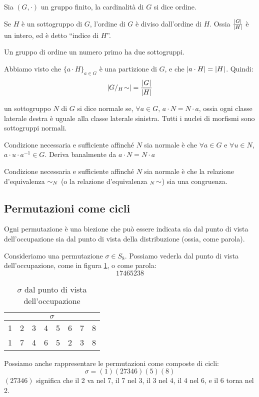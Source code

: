 \begin{theorem}
Sia $(G, \cdot)$ un gruppo finito, la cardinalit\`a di $G$ si dice ordine.

Se $H$ \`e un sottogruppo di $G$, l'ordine di $G$ \`e diviso dall'ordine di $H$. Ossia $\frac{\left\lvert{G}\right\rvert}{\left\lvert{H}\right\rvert}$ \`e un intero, ed \`e detto ``indice di $H$''.
\end{theorem}
\begin{oss}
Un gruppo di ordine un numero primo ha due sottogruppi.
\end{oss}
Abbiamo visto che $\{ a \cdot H\}_{a \in G}$ \`e una partizione di $G$, e che $\left\lvert{a \cdot H}\right\rvert = \left\lvert{H}\right\rvert$. Quindi:
\[
\left\lvert{G / {}_{H}\!\sim}\right\rvert = \frac{\left\lvert{G}\right\rvert}{\left\lvert{H}\right\rvert}
\]

\begin{defn}
un sottogruppo $N$ di $G$ si dice normale se, $\forall a \in G$, $a \cdot N = N \cdot a$, ossia ogni classe laterale destra \`e uguale alla classe laterale sinistra. Tutti i nuclei di morfismi sono sottogruppi normali.
\end{defn}
Condizione necessaria e sufficiente affinch\'e $N$ sia normale \`e che $\forall a \in G$ e $\forall u \in N$, $a \cdot u \cdot a^{-1} \in G$. Deriva banalmente da $a \cdot N = N \cdot a$

Condizione necessaria e sufficiente affinch\'e $N$ sia normale \`e che la relazione d'equivalenza $\sim_{N}$ (o la relazione d'equivalenza ${}_{N}\!\sim$) sia una congruenza.

\subsection{Permutazioni come cicli}

Ogni permutazione \`e una biezione che pu\`o essere indicata sia dal punto di vista dell'occupazione sia dal punto di vista della distribuzione (ossia, come parola).

Consideriamo una permutazione $\sigma \in S_8$. Possiamo vederla dal punto di vista dell'occupazione, come in figura \ref{tab:cicli_sigma_occupazione}, o come parola:
\[
17465238
\]
\begin{table}[ht]
\centering
\begin{tabular}{*{8}{c}}
\multicolumn{8}{c}{$\sigma$} \\
\hline
1 & 2 & 3 & 4 & 5 & 6 & 7 & 8 \\
1 & 7 & 4 & 6 & 5 & 2 & 3 & 8
\end{tabular}
\caption{$\sigma$ dal punto di vista dell'occupazione\label{tab:cicli_sigma_occupazione}}
\end{table}
Possiamo anche rappresentare le permutazioni come composte di cicli:
\[
\sigma = (1) (2 7 3 4 6) (5) (8)
\]
$(2 7 3 4 6)$ significa che il 2 va nel 7, il 7 nel 3, il 3 nel 4, il 4 nel 6, e il 6 torna nel 2.

